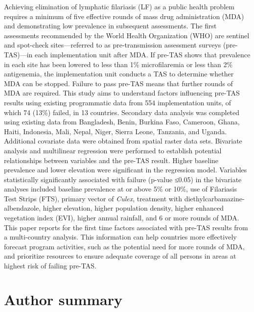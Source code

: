 \documentclass[11pt,a4paper]{article}
\begin{document}
Achieving elimination of lymphatic filariasis (LF) as a public health problem requires a minimum of five effective rounds of mass drug administration (MDA) and demonstrating low prevalence in subsequent assessments. The first assessments recommended by the World Health Organization (WHO) are sentinel and spot-check sites—referred to as pre-transmission assessment surveys (pre-TAS)—in each implementation unit after MDA. If pre-TAS shows that prevalence in each site has been lowered to less than 1\% microfilaremia or less than 2\% antigenemia, the implementation unit conducts a TAS to determine whether MDA can be stopped. Failure to pass pre-TAS means that further rounds of MDA are required. This study aims to understand factors influencing pre-TAS results using existing programmatic data from 554 implementation units, of which 74 (13\%) failed, in 13 countries. Secondary data analysis was completed using existing data from Bangladesh, Benin, Burkina Faso, Cameroon, Ghana, Haiti, Indonesia, Mali, Nepal, Niger, Sierra Leone, Tanzania, and Uganda. Additional covariate data were obtained from spatial raster data sets. Bivariate analysis and multilinear regression were performed to establish potential relationships between variables and the pre-TAS result. Higher baseline prevalence and lower elevation were significant in the regression model. Variables statistically significantly associated with failure (p-value ≤0.05) in the bivariate analyses included baseline prevalence at or above 5\% or 10\%, use of Filariasis Test Strips (FTS), primary vector of \textit{Culex}, treatment with diethylcarbamazine-albendazole, higher elevation, higher population density, higher enhanced vegetation index (EVI), higher annual rainfall, and 6 or more rounds of MDA. This paper reports for the first time factors associated with pre-TAS results from a multi-country analysis. This information can help countries more effectively forecast program activities, such as the potential need for more rounds of MDA, and prioritize resources to ensure adequate coverage of all persons in areas at highest risk of failing pre-TAS.

\section{Author summary}
\end{document}

